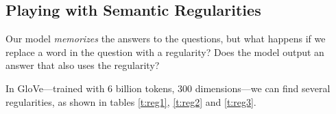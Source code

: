 \documentclass[]{article}
\begin{document}
	\subsection{Playing with Semantic Regularities}
	
	Our model \emph{memorizes} the answers to the questions, but what happens if we replace a word in the question with a regularity? Does the model output an answer that also uses the regularity?
	
	In GloVe---trained with 6 billion tokens, 300 dimensions---we can find several regularities, as shown in tables \ref{t:reg1}, \ref{t:reg2} and \ref{t:reg3}.
	
	\begin{table}[H]
		\centering
		\caption{A regularity between dictators and the countries under their power.}
		\label{t:reg1}
	\end{table}
	
	\begin{table}[H]
		\centering
		\caption{A regularity between presidents and the countries they preside.}
		\label{t:reg2}
	\end{table}
	
\end{document}
